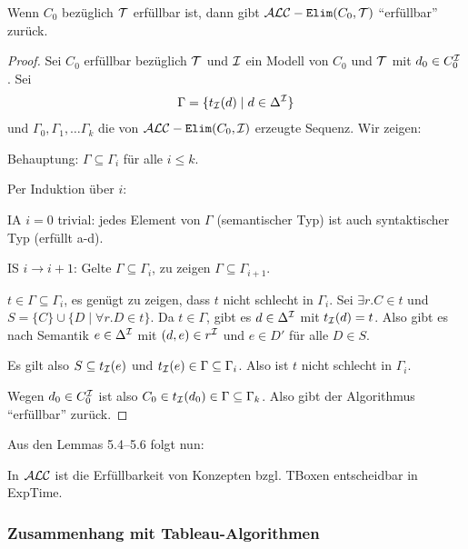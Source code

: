 \begin{lemma}
    Wenn $C_0$ bezüglich $\mathcal{T}$ erfüllbar ist, dann gibt $\mathcal{A}\mathcal{L}\mathcal{C}-\texttt{Elim}(C_0, \mathcal{T})$ \enquote{erfüllbar} zurück.
\end{lemma}

\begin{proof}
    Sei $C_0$ erfüllbar bezüglich $\mathcal{T}$ und $\mathcal{I}$ ein Modell von $C_0$ und $\mathcal{T}$ mit $d_0 \in C_0^{\mathcal{I}}$. Sei
    \begin{align*}
        \Gamma = \{ t_{\mathcal{I}}(d) \mid d \in \Delta^{\mathcal{I}}\}
    \end{align*}
    und $\Gamma_0, \Gamma_1, \ldots \Gamma_k$ die von $\mathcal{A}\mathcal{L}\mathcal{C}-\texttt{Elim}(C_0, \mathcal{I})$ erzeugte Sequenz.
    Wir zeigen:

    Behauptung: $\Gamma \subseteq \Gamma_i$ für alle $i \leq k$.
    \begin{tafel}
    Per Induktion über $i$:

    IA $i = 0$ trivial: jedes Element von $\Gamma$ (semantischer Typ) ist auch syntaktischer Typ (erfüllt a-d).

    IS $i \rightarrow i + 1$: Gelte $\Gamma \subseteq \Gamma_i$, zu zeigen $\Gamma \subseteq \Gamma_{i + 1}$.

    $t \in \Gamma \subseteq \Gamma_i$, es genügt zu zeigen, dass $t$ nicht schlecht in $\Gamma_i$. Sei $\exists r.C \in t$ und $S = \{C\} \cup \{D\mid \forall r.D \in t\}$. Da $t \in \Gamma$, gibt es $d \in \Delta^{\mathcal{I}}$ mit $t_{\mathcal{I}}(d) = t$. Also gibt es nach Semantik $e \in \Delta^{\mathcal{I}}$ mit $(d, e) \in r^{\mathcal{I}}$ und $e \in D'$ für alle $D \in S$.

    Es gilt also $S \subseteq t_{\mathcal{I}}(e)$ und $t_{\mathcal{I}}(e) \in \Gamma \subseteq \Gamma_i$. Also ist $t$ nicht schlecht in $\Gamma_i$.
    \end{tafel}
    Wegen $d_0 \in C_0^{\mathcal{I}}$ ist also $C_0 \in t_{\mathcal{I}}(d_0) \in \Gamma \subseteq \Gamma_k$. Also gibt der Algorithmus \enquote{erfüllbar} zurück.
\end{proof}


Aus den Lemmas 5.4--5.6 folgt nun:

\begin{theorem}\label{thm:tbox-exptime}
In $\mathcal{A}\mathcal{L}\mathcal{C}$ ist die Erfüllbarkeit von Konzepten bzgl. TBoxen entscheidbar in ExpTime.
\end{theorem}

\subsubsection{Zusammenhang mit Tableau-Algorithmen}

